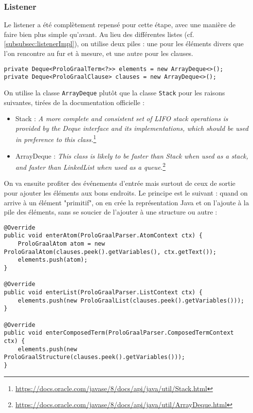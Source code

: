 \documentclass[../report.tex]{subfiles}
\begin{document}
\subsubsection{Listener}\label{subsubsec:phase3listener}
Le listener a été complètement repensé pour cette étape, avec une manière de faire bien plus simple qu'avant. Au lieu des différentes listes (cf. \ref{subsubsec:listenerImpl}), on utilise deux piles : une pour les éléments divers que l'on rencontre au fur et à mesure, et une autre pour les clauses.
\begin{verbatim}
private Deque<ProloGraalTerm<?>> elements = new ArrayDeque<>();
private Deque<ProloGraalClause> clauses = new ArrayDeque<>();
\end{verbatim}
On utilise la classe \texttt{ArrayDeque} plutôt que la classe \texttt{Stack} pour les raisons suivantes, tirées de la documentation officielle :
\begin{itemize}
    \item Stack : \textit{A more complete and consistent set of LIFO stack operations is provided by the Deque interface and its implementations, which should be used in preference to this class.}\footnote{\href{https://docs.oracle.com/javase/8/docs/api/java/util/Stack.html}{https://docs.oracle.com/javase/8/docs/api/java/util/Stack.html}}
    \item ArrayDeque : \textit{This class is likely to be faster than Stack when used as a stack, and faster than LinkedList when used as a queue.}\footnote{\href{https://docs.oracle.com/javase/8/docs/api/java/util/ArrayDeque.html}{https://docs.oracle.com/javase/8/docs/api/java/util/ArrayDeque.html}}
\end{itemize}
On va ensuite profiter des événements d'entrée mais surtout de ceux de sortie pour ajouter les éléments aux bons endroits. Le principe est le suivant : quand on arrive à un élément "primitif", on en crée la représentation Java et on l'ajoute à la pile des éléments, sans se soucier de l'ajouter à une structure ou autre :
\begin{verbatim}
@Override
public void enterAtom(ProloGraalParser.AtomContext ctx) {
    ProloGraalAtom atom = new ProloGraalAtom(clauses.peek().getVariables(), ctx.getText());
    elements.push(atom);
}

@Override
public void enterList(ProloGraalParser.ListContext ctx) {
    elements.push(new ProloGraalList(clauses.peek().getVariables()));
}

@Override
public void enterComposedTerm(ProloGraalParser.ComposedTermContext ctx) {
    elements.push(new ProloGraalStructure(clauses.peek().getVariables()));
}
\end{verbatim}
\end{document}
